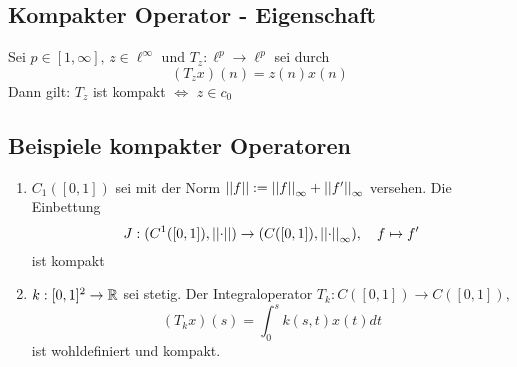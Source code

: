 \documentclass[FunkAnaSkript.tex]{subfiles}
\begin{document}
\subsection{ Kompakter Operator - Eigenschaft}
\label{B13.3}
	Sei $p\in [1,\infty],\, z\in \ell^\infty$ und $T_z : \ell^p \to \ell^p$ sei durch 
	$$(T_z x) (n) = z(n)x(n)$$\todoo[$z(n) = z_n$ ??]
	Dann gilt: $T_z$ ist kompakt $\Leftrightarrow$ $z\in c_0$
	
	
\subsection{ Beispiele kompakter Operatoren}
\label{B13.4}
	\begin{enumerate}
	\item $C_1([0,1])$ sei mit der Norm $\left\lvert \left\lvert f \right\rvert \right\rvert := \left\lvert \left\lvert f \right\rvert \right\rvert_\infty + \left\lvert \left\lvert f' \right\rvert \right\rvert_\infty$ versehen. Die Einbettung
	$$J : (C^1([0,1]),\left\lvert \left\lvert \cdot \right\rvert \right\rvert) \to (C([0,1]) , \left\lvert \left\lvert \cdot \right\rvert \right\rvert_\infty),\quad f \mapsto f'$$
	ist kompakt
	\item $k:[0,1]^2 \to \mathbb{R}$ sei stetig. Der Integraloperator $T_k : C([0,1]) \to C([0,1]),$
	$$(T_kx)(s) = \int^s_0 k(s,t)x(t) dt$$
	ist wohldefiniert und kompakt.
	\end{enumerate}
\end{document}

